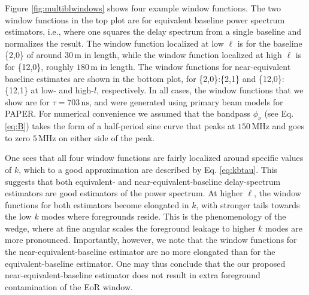 \documentclass[twocolumn,apj,numberedappendix]{emulateapj}
\renewcommand\[{\begin{equation}}
\renewcommand\]{\end{equation}}
\begin{document}
Figure \ref{fig:multiblwindows} shows four example window functions. The two window functions in the top plot are for equivalent baseline power spectrum estimators, i.e., where one squares the delay spectrum from a single baseline and normalizes the result. The window function localized at low $\ell$ is for the baseline \{2,0\} of around $30\,\textrm{m}$ in length, while the window function localized at high $\ell$ is for \{12,0\}, roughly $180\,\textrm{m}$ in length. The window functions for near-equivalent baseline estimates are shown in the bottom plot, for \{2,0\}:\{2,1\} and \{12,0\}:\{12,1\} at low- and high-$l$, respectively. In all cases, the window functions that we show are for $\tau = 703\,\textrm{ns}$, and were generated using primary beam models for PAPER. For numerical convenience we assumed that the bandpass $\phi_\nu$ (see Eq. \eqref{eq:B}) takes the form of a half-period sine curve that peaks at $150\,\textrm{MHz}$ and goes to zero $5\,\textrm{MHz}$ on either side of the peak.

One sees that all four window functions are fairly localized around specific values of $k$, which to a good approximation are described by Eq. \eqref{eq:kbtau}. This suggests that both equivalent- and near-equivalent-baseline delay-spectrum estimators are good estimators of the power spectrum. At higher $\ell$, the window functions for both estimators become elongated in $k$, with stronger tails towards the low $k$ modes where foregrounds reside. This is the phenomenology of the wedge, where at fine angular scales the foreground leakage to higher $k$ modes are more pronounced. Importantly, however, we note that the window functions for the near-equivalent-baseline estimator are no more elongated than for the equivalent-baseline estimator. One may thus conclude that the our proposed near-equivalent-baseline estimator does not result in extra foreground contamination of the EoR window.

\end{document}
